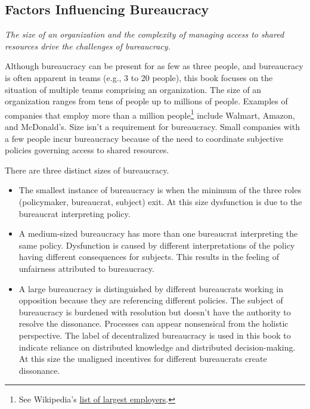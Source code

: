 \subsection*{Factors Influencing Bureaucracy}

\textit{The size of an organization and the complexity of managing access to shared resources drive the challenges of bureaucracy.}

Although bureaucracy can be present for as few as three people, and bureaucracy is often apparent in teams (e.g., 3 to 20 people), this book focuses on the situation of multiple teams comprising an organization. The size of an organization ranges from tens of people up to millions of people. 
Examples of companies that employ more than a million people\footnote{See Wikipedia's \href{https://en.wikipedia.org/wiki/List_of_largest_employers}{list of largest employers}.
} include Walmart, Amazon, and McDonald's. Size isn't a requirement for bureaucracy. Small companies with a few people incur bureaucracy because of the need to coordinate subjective policies governing access to shared resources. 


There are three distinct sizes of bureaucracy.
\begin{itemize}
\item The smallest instance of bureaucracy is when the minimum of the three roles (policymaker, bureaucrat, subject) exit. At this size dysfunction is due to the bureaucrat interpreting policy.
\item A medium-sized bureaucracy has more than one bureaucrat interpreting the same policy. Dysfunction is caused by different interpretations of the policy having different consequences for subjects. This results in the feeling of unfairness attributed to bureaucracy.
\item A large bureaucracy is distinguished by different bureaucrats working in opposition because they are referencing different policies. The subject of bureaucracy is burdened with resolution but doesn't have the authority to resolve the dissonance. Processes can appear nonsensical from the holistic perspective.
The label of \gls{decentralized bureaucracy} is used in this book to indicate reliance on distributed knowledge and distributed decision-making. At this size the unaligned incentives for different bureaucrats create dissonance.
\end{itemize}

